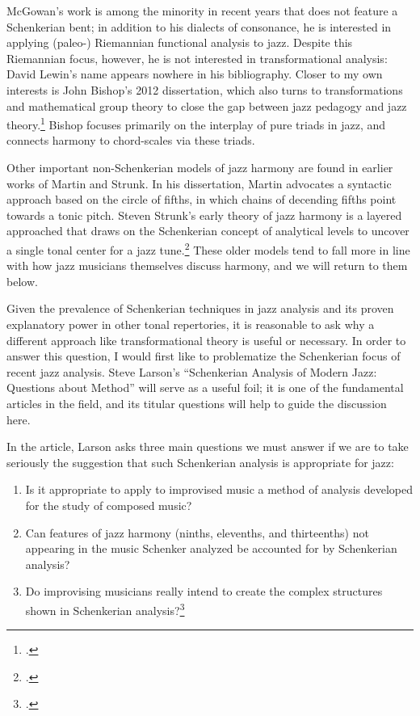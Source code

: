 \documentclass[diss]{subfiles}
\begin{document}
McGowan’s work is among the minority in recent years that does not feature a
Schenkerian bent; in addition to his dialects of consonance, he is interested
in applying (paleo-) Riemannian functional analysis to jazz. Despite
this Riemannian focus, however, he is not interested in transformational
analysis: David Lewin’s name appears nowhere in his bibliography.
Closer to my own interests is John Bishop’s 2012 dissertation, which also
turns to transformations and mathematical group theory to close the gap
between jazz pedagogy and jazz theory.\footcite{bishop:2012} Bishop focuses
primarily on the interplay of pure triads in jazz, and connects harmony to
chord-scales via these triads.

Other important non-Schenkerian models of jazz harmony are found in earlier
works of Martin and Strunk. In his dissertation, Martin advocates a syntactic
approach based on the circle of fifths, in which chains of decending fifths
point towards a tonic pitch. Steven Strunk’s early theory of jazz
harmony is a layered approached that draws on the Schenkerian concept of
analytical levels to uncover a single tonal center for a jazz
tune.\footcite{strunk:1979} These older models tend to fall more in line with
how jazz musicians themselves discuss harmony, and we will return to them
below.

Given the prevalence of Schenkerian techniques in jazz analysis and its proven
explanatory power in other tonal repertories, it is reasonable to ask why a
different approach like transformational theory is useful or necessary. In
order to answer this question, I would first like to problematize the
Schenkerian focus of recent jazz analysis. Steve Larson’s “Schenkerian
Analysis of Modern Jazz: Questions about Method” will serve as a useful foil;
it is one of the fundamental articles in the field, and its titular questions
will help to guide the discussion here.

In the article, Larson asks three main questions we must answer if we are to
take seriously the suggestion that such Schenkerian analysis is appropriate
for jazz:
\begin{enumerate}
  \singlespacing
  \item Is it appropriate to apply to improvised music a method of analysis
    developed for the study of composed music?
  \item Can features of jazz harmony (ninths, elevenths, and thirteenths) not
    appearing in the music Schenker analyzed be accounted for by Schenkerian
    analysis?
  \item Do improvising musicians really intend to create the complex
    structures shown in Schenkerian analysis?\footcite[210]{larson:1998}
\end{enumerate}
\end{document}
